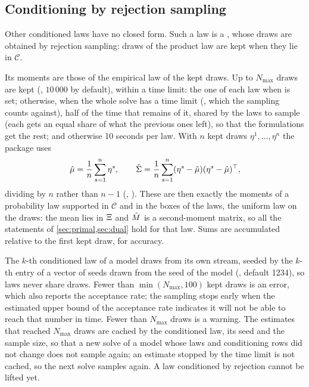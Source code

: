\subsection{Conditioning by rejection sampling}
\label{sec:rejection}

Other conditioned laws have no closed form.
Such a law is a ,
whose draws are obtained by rejection sampling:
draws of the product law are kept when they lie in $\mathcal{C}$.

Its moments are those of the empirical law of the kept draws.
Up to $N_{\max}$ draws are kept (, $10\,000$ by default), within a time limit:
the one of each law when  is set;
otherwise, when the whole solve has a time limit (, which the sampling counts against), half of the time that remains of it, shared by the laws to sample (each gets an equal share of what the previous ones left), so that the formulations get the rest;
and otherwise 10 seconds per law.
With $n$ kept draws $\eta^1, \dots, \eta^n$ the package uses
\[
\hat\mu = \frac1n\sum_{s=1}^n \eta^s, \qquad \hat{\Sigma} = \frac1n\sum_{s=1}^n (\eta^s - \hat\mu)(\eta^s - \hat\mu)^\top,
\]
dividing by $n$ rather than $n - 1$ (, ).
These are then exactly the moments of a probability law supported in $\mathcal{C}$ and in the boxes of the laws,
the uniform law on the draws:
the mean lies in $\Xi$ and $\hat{M}$ is a second-moment matrix, so all the statements of \cref{sec:primal,sec:dual} hold for that law.
Sums are accumulated relative to the first kept draw, for accuracy.

The $k$-th conditioned law of a model draws from its own stream,
seeded by the $k$-th entry of a vector of seeds
drawn from the seed of the model (, default 1234),
so laws never share draws.
Fewer than $\min(N_{\max}, 100)$ kept draws is an error, which also reports the acceptance rate;
the sampling stops early when the estimated upper bound of the acceptance rate
indicates it will not be able to reach that number in time.
Fewer than $N_{\max}$ draws is a warning.
The estimates that reached $N_{\max}$ draws are cached by the conditioned law, its seed and the sample size,
so that a new solve of a model whose laws and conditioning rows did not change
does not sample again; an estimate stopped by the time limit is not cached, so the next solve samples again.
A law conditioned by rejection cannot be lifted yet.

